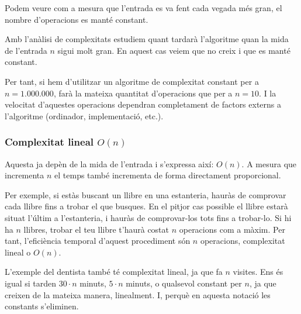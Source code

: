 Podem veure com a mesura que l'entrada es va fent cada vegada més gran, el nombre d'operacions es manté constant.

Amb l'anàlisi de complexitats estudiem quant tardarà l'algoritme quan la mida de l'entrada $n$ sigui molt gran. En aquest cas veiem que no creix i que es manté constant. 

Per tant, si hem d'utilitzar un algoritme de complexitat constant per a $n = 1.000.000$, farà la mateixa quantitat d'operacions que per a $n = 10$. I la velocitat d'aquestes operacions dependran completament de factors externs a l'algoritme (ordinador, implementació, etc.).

\subsubsection*{Complexitat lineal $O(n)$}
Aquesta ja depèn de la mida de l'entrada i s'expressa així: $O(n)$. A mesura que incrementa $n$ el temps també incrementa de forma directament proporcional.

Per exemple, si estàs buscant un llibre en una estanteria, hauràs de comprovar cada llibre fins a trobar el que busques. En el pitjor cas possible el llibre estarà situat l'últim a l'estanteria, i hauràs de comprovar-los tots fins a trobar-lo. Si hi ha $n$ llibres, trobar el teu llibre t'haurà costat $n$ operacions com a màxim. Per tant, l'eficiència temporal d'aquest procediment són $n$ operacions, complexitat lineal o $O(n)$.

L'exemple del dentista també té complexitat lineal, ja que fa $n$ visites. Ens és igual si tarden $30 \cdot n$ minuts, $5 \cdot n$ minuts, o qualsevol constant per $n$, ja que creixen de la mateixa manera, linealment. I, perquè en aquesta notació les constants s'eliminen.

